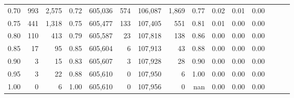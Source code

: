\begin{tabular}{rrrrrrrrrrrrrrr}
0.70 &      993 &   2,575 &  0.72 &  605,036 &      574 &  106,087 &    1,869 &  0.77 &  0.02 &  0.01 &      0.00 \\
0.75 &      441 &   1,318 &  0.75 &  605,477 &      133 &  107,405 &      551 &  0.81 &  0.01 &  0.00 &      0.00 \\
0.80 &      110 &     413 &  0.79 &  605,587 &       23 &  107,818 &      138 &  0.86 &  0.00 &  0.00 &      0.00 \\
0.85 &       17 &      95 &  0.85 &  605,604 &        6 &  107,913 &       43 &  0.88 &  0.00 &  0.00 &      0.00 \\
0.90 &        3 &      15 &  0.83 &  605,607 &        3 &  107,928 &       28 &  0.90 &  0.00 &  0.00 &      0.00 \\
0.95 &        3 &      22 &  0.88 &  605,610 &        0 &  107,950 &        6 &  1.00 &  0.00 &  0.00 &      0.00 \\
1.00 &        0 &       6 &  1.00 &  605,610 &        0 &  107,956 &        0 &   nan &  0.00 &  0.00 &      0.00 \\
\bottomrule
\end{tabular}
